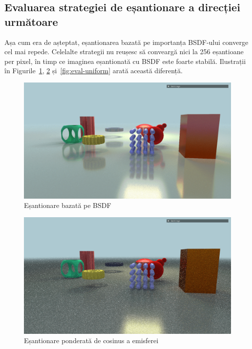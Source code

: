 \documentclass[12pt,a4paper]{report}
\numberwithin{equation}{section} %
\begin{document}
\subsection{Evaluarea strategiei de eșantionare a direcției următoare}

Așa cum era de așteptat, eșantionarea bazată pe importanța BSDF-ului converge cel mai repede.
Celelalte strategii nu reușesc să conveargă nici la 256 eșantioane per pixel, în timp ce
imaginea eșantionată cu BSDF este foarte stabilă. Ilustrații în Figurile~\ref{fig:eval-bsdf},
\ref{fig:eval-cosine} și~\ref{fig:eval-uniform} arată această diferență.

\begin{figure}[!htb]
	\centering
	\includegraphics[width=\textwidth]{pics/demo-bsdf.png}
	\caption{Eșantionare bazată pe BSDF}
	\label{fig:eval-bsdf}
\end{figure}
\begin{figure}[!htb]
	\centering
	\includegraphics[width=\textwidth]{pics/demo-cosine.png}
	\caption{Eșantionare ponderată de cosinus a emisferei}
	\label{fig:eval-cosine}
\end{figure}
\end{document}
